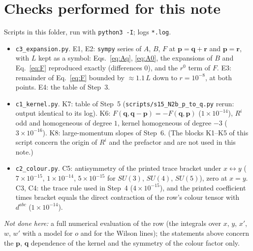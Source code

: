 \documentclass[11pt]{article}
\newcommand{\vq}{\mathbf{q}}
\newcommand{\vp}{\mathbf{p}}
\newcommand{\vr}{\mathbf{r}}
\begin{document}
\section{Checks performed for this note}\label{sec:checks}
Scripts in this folder, run with \texttt{python3 -I}; logs \texttt{*.log}.
\begin{itemize}\itemsep1pt
\item \texttt{c3\_expansion.py}. E1, E2: \texttt{sympy} series of $A$, $B$, $F$ at $\vp=\vq+\vr$ and $\vp=\vr$, with $L$ kept as a symbol: Eqs.~\eqref{eq:Aq}, \eqref{eq:A0}, the expansions of $B$ and Eq.~\eqref{eq:F} reproduced exactly (differences $0$), and the $r^{0}$ term of $F$. E3: remainder of Eq.~\eqref{eq:F} bounded by $\approx1.1\,L$ down to $r=10^{-8}$, at both points. E4: the table of Step~3.
\item \texttt{c1\_kernel.py}. K7: table of Step~5 (\texttt{scripts/s15\_N2b\_p\_to\_q.py} rerun: output identical to its log). K6: $F(\vq,\vq-\vp)=-F(\vq,\vp)$ ($1\times10^{-14}$), $R^{i}$ odd and homogeneous of degree $1$, kernel homogeneous of degree $-3$ ($3\times10^{-16}$). K8: large-momentum slopes of Step~6. (The blocks K1--K5 of this script concern the origin of $R^{i}$ and the prefactor and are not used in this note.)
\item \texttt{c2\_colour.py}. C5: antisymmetry of the printed trace bracket under $x\leftrightarrow y$ ($7\times10^{-15}$, $1\times10^{-14}$, $5\times10^{-15}$ for $SU(3)$, $SU(4)$, $SU(5)$), zero at $x=y$. C3, C4: the trace rule used in Step~4 ($4\times10^{-15}$), and the printed coefficient times bracket equals the direct contraction of the row's colour tensor with $d^{abc}$ ($1\times10^{-14}$).
\end{itemize}
\emph{Not done here:} a full numerical evaluation of the row (the integrals over $x$, $y$, $x'$, $w$, $w'$ with a model for $o$ and for the Wilson lines); the statements above concern the $\vp$, $\vq$ dependence of the kernel and the symmetry of the colour factor only.
\end{document}
